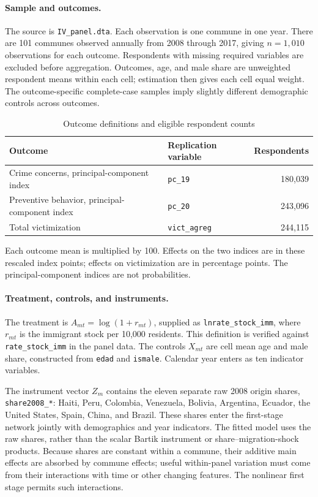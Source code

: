 \documentclass{article}
\begin{document}
\paragraph{Sample and outcomes.}
The source is \texttt{IV\_panel.dta}. Each observation is one commune in one year. There are 101 communes observed annually from 2008 through 2017, giving $n=1{,}010$ observations for each outcome. Respondents with missing required variables are excluded before aggregation. Outcomes, age, and male share are unweighted respondent means within each cell; estimation then gives each cell equal weight. The outcome-specific complete-case samples imply slightly different demographic controls across outcomes.
\begin{table}[H]
\centering
\caption{Outcome definitions and eligible respondent counts}
\label{tab:neural-outcomes}
\small
\begin{tabularx}{\linewidth}{@{}Xlr@{}}
\toprule
Outcome & Replication variable & Respondents\\
\midrule
Crime concerns, principal-component index & \texttt{pc\_19} & 180,039\\
Preventive behavior, principal-component index & \texttt{pc\_20} & 243,096\\
Total victimization & \texttt{vict\_agreg} & 244,115\\
\bottomrule
\end{tabularx}
\end{table}
Each outcome mean is multiplied by 100. Effects on the two indices are in these rescaled index points; effects on victimization are in percentage points. The principal-component indices are not probabilities.

\paragraph{Treatment, controls, and instruments.}
The treatment is $A_{mt}=\log(1+r_{mt})$, supplied as \texttt{lnrate\_stock\_imm}, where $r_{mt}$ is the immigrant stock per 10,000 residents. This definition is verified against \texttt{rate\_stock\_imm} in the panel data. The controls $X_{mt}$ are cell mean age and male share, constructed from \texttt{edad} and \texttt{ismale}. Calendar year enters as ten indicator variables.

The instrument vector $Z_m$ contains the eleven separate raw 2008 origin shares, \texttt{share2008\_*}: Haiti, Peru, Colombia, Venezuela, Bolivia, Argentina, Ecuador, the United States, Spain, China, and Brazil. These shares enter the first-stage network jointly with demographics and year indicators. The fitted model uses the raw shares, rather than the scalar Bartik instrument or share--migration-shock products. Because shares are constant within a commune, their additive main effects are absorbed by commune effects; useful within-panel variation must come from their interactions with time or other changing features. The nonlinear first stage permits such interactions.
\end{document}

